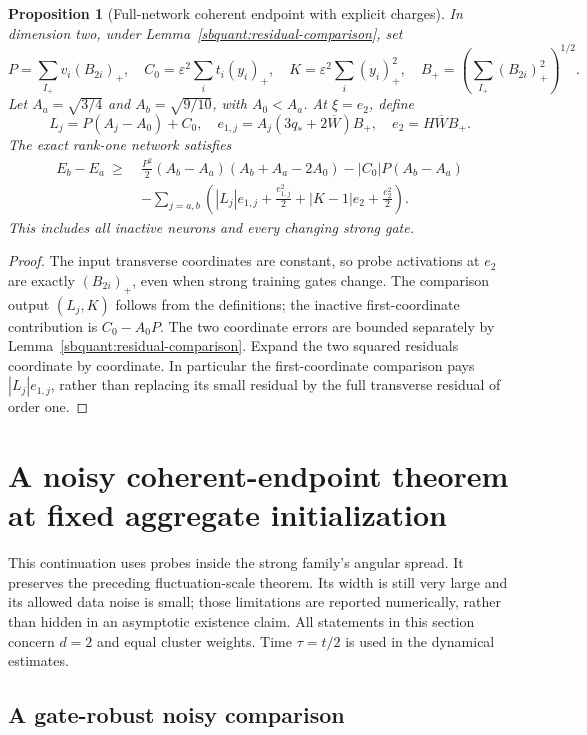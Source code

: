 \documentclass{article} %
\theoremstyle{plain}
\newtheorem{proposition}[theorem]{Proposition}
\theoremstyle{definition}
\theoremstyle{remark}
\begin{document}
\begin{proposition}[Full-network coherent endpoint with explicit charges]
\label{sbquant:coherent-finite}
In dimension two, under Lemma~\ref{sbquant:residual-comparison}, set
\[
 P=\sum_{I_+}v_i(B_{2i})_+,\quad
 C_0=\varepsilon^2\sum_i t_i(y_i)_+,\quad
 K=\varepsilon^2\sum_i(y_i)_+^2,\quad
 B_+=\left(\sum_{I_+}(B_{2i})_+^2\right)^{1/2}.
\]
Let $A_a=\sqrt{3/4}$ and $A_b=\sqrt{9/10}$, with $A_0<A_a$.
At $\xi=e_2$, define
\[
 L_j=P(A_j-A_0)+C_0,\quad
 e_{1,j}=A_j(3q_*+2\overline W)B_+,\quad
 e_2=H\overline W B_+.
\]
The exact rank-one network satisfies
\begin{align}\label{sbquant:coherent-finite-gap}
 E_b-E_a\ \ge\ &\frac{P^2}{2}(A_b-A_a)(A_b+A_a-2A_0)
                  -|C_0|P(A_b-A_a)\\
 &-\sum_{j=a,b}\left(|L_j|e_{1,j}+\frac{e_{1,j}^2}{2}
                   +|K-1|e_2+\frac{e_2^2}{2}\right).\nonumber
\end{align}
This includes all inactive neurons and every changing strong gate.
\end{proposition}
\begin{proof}
The input transverse coordinates are constant, so probe activations at
$e_2$ are exactly $(B_{2i})_+$, even when strong training gates change.
The comparison output $(L_j,K)$ follows from the definitions; the inactive
first-coordinate contribution is $C_0-A_0P$.
The two coordinate errors are bounded separately by
Lemma~\ref{sbquant:residual-comparison}.
Expand the two squared residuals coordinate by coordinate. In particular
the first-coordinate comparison pays $|L_j|e_{1,j}$, rather than replacing
its small residual by the full transverse residual of order one.
\end{proof}

\section{A noisy coherent-endpoint theorem at fixed aggregate initialization}
\label{sbwide:scope}

This continuation uses probes inside the strong family's angular spread.
It preserves the preceding fluctuation-scale theorem. Its width is still
very large and its allowed data noise is small; those limitations are
reported numerically, rather than hidden in an asymptotic existence claim.
All statements in this section concern $d=2$ and equal cluster weights.
Time $\tau=t/2$ is used in the dynamical estimates.

\subsection{A gate-robust noisy comparison}
\end{document}
